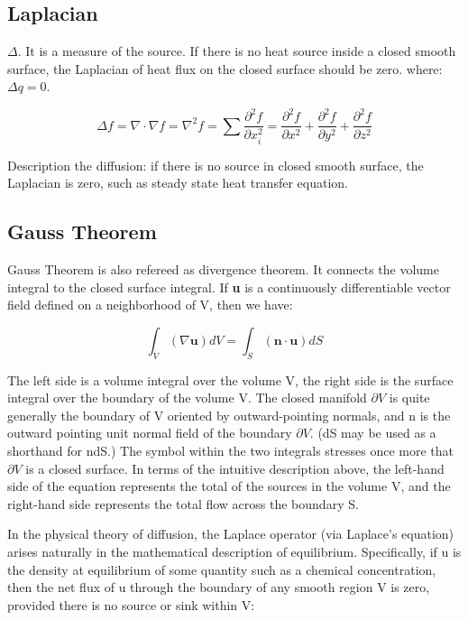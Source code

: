 \documentclass{article}
\begin{document}
\subsection{Laplacian} 
$\Delta$. It is a measure of the source. If there is no heat source inside a closed smooth surface, the Laplacian of heat flux on the closed surface should be zero. 
where: $\Delta q = 0$. 

\begin{equation}
\Delta f= \nabla \cdot \nabla f = \nabla ^2 f = \sum \frac{\partial ^2 f}{\partial x_i ^2} = \frac{\partial ^2 f}{\partial x^2}+\frac{\partial ^2 f}{\partial y^2}+\frac{\partial ^2 f}{\partial z^2}
\end{equation}

Description the diffusion: if there is no source in closed smooth surface, the Laplacian is zero, such as steady state heat transfer equation. 

\subsection{Gauss Theorem}
Gauss Theorem is also refereed as divergence theorem. It connects the volume integral to the closed surface integral.
If \textbf{u} is a continuously differentiable vector field defined on a neighborhood of V, then we have:

\begin{equation}
\int_V(\nabla \mathbf{u}) dV = \int_S(\mathbf{n} \cdot \mathbf{u}) dS 
\end{equation}

The left side is a volume integral over the volume V, the right side is the surface integral over the boundary of the volume V. The closed manifold $\partial V$ is quite generally the boundary of V oriented by outward-pointing normals, and n is the outward pointing unit normal field of the boundary $\partial V$. (dS may be used as a shorthand for ndS.) The symbol within the two integrals stresses once more that $\partial V$ is a closed surface. In terms of the intuitive description above, the left-hand side of the equation represents the total of the sources in the volume V, and the right-hand side represents the total flow across the boundary S.

In the physical theory of diffusion, the Laplace operator (via Laplace's equation) arises naturally in the mathematical description of equilibrium. Specifically, if u is the density at equilibrium of some quantity such as a chemical concentration, then the net flux of u through the boundary of any smooth region V is zero, provided there is no source or sink within V:
\end{document}

